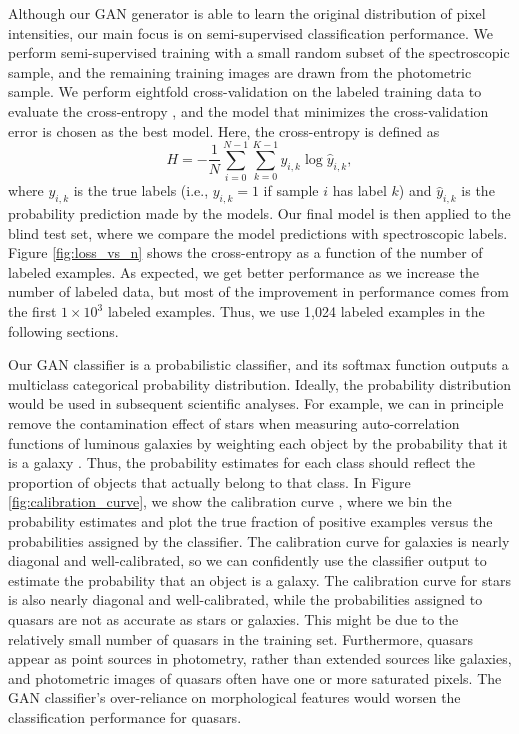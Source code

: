 \documentclass[fleqn,usenatbib]{mnras}
\newcommand{\ie}{{i.e., }}
\begin{document}
Although our GAN generator is able to learn the original distribution of pixel intensities,
our main focus is on semi-supervised classification performance.
We perform semi-supervised training with a small random subset of the spectroscopic sample,
and the remaining training images are drawn from the photometric sample.
We perform eightfold cross-validation on the labeled training data to evaluate the cross-entropy
\citep[also called log loss;][]{murphy2012machine},
and the model that minimizes the cross-validation error is chosen as the best model.
Here, the cross-entropy is defined as
\begin{equation}
H = - \frac{1}{N} \sum_{i=0}^{N-1} \sum_{k=0}^{K-1} y_{i,k} \log \hat{y}_{i,k},
\end{equation}
where $y_{i,k}$ is the true labels (\ie $y_{i,k} = 1$ if sample $i$ has label $k$) and
$\hat{y}_{i,k}$ is the probability prediction made by the models.
Our final model is then applied to the blind test set, where we compare the model predictions with spectroscopic labels.
Figure \ref{fig:loss_vs_n} shows the cross-entropy as a function of the number of labeled examples.
As expected, we get better performance as we increase the number of labeled data,
but most of the improvement in performance comes from the first $1 \times 10^3$ labeled examples.
Thus, we use 1,024 labeled examples in the following sections.

Our GAN classifier is a probabilistic classifier, and its softmax function outputs a multiclass categorical
probability distribution.
Ideally, the probability distribution would be used in subsequent scientific analyses.
For example, we can in principle remove the contamination effect of stars when measuring auto-correlation functions of
luminous galaxies by weighting each object by the probability that it is a galaxy \citep{ross2011ameliorating}.
Thus, the probability estimates for each class should reflect the proportion of objects that actually belong to that class.
In Figure \ref{fig:calibration_curve}, we show the calibration curve \citep[or reliability curves;][]{degroot1983comparison},
where we bin the probability estimates and plot the true fraction of positive examples versus the probabilities assigned
by the classifier.
The calibration curve for galaxies is nearly diagonal and well-calibrated, so we can confidently use the
classifier output to estimate the probability that an object is a galaxy.
The calibration curve for stars is also nearly diagonal and well-calibrated,
while the probabilities assigned to quasars are not as accurate as stars or galaxies.
This might be due to the relatively small number of quasars in the training set.
Furthermore, quasars appear as point sources in photometry, rather than extended sources like galaxies,
and photometric images of quasars often have one or more saturated pixels.
The GAN classifier's over-reliance on morphological features would worsen the classification performance for quasars.
\end{document}
